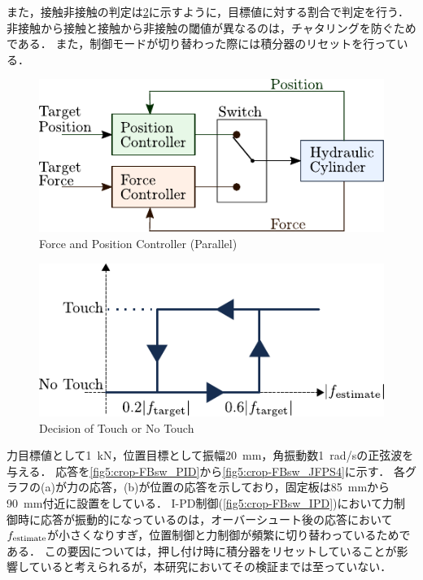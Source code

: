 また，接触非接触の判定は\figname\ref{fig5:touch_define}に示すように，目標値に対する割合で判定を行う．
非接触から接触と接触から非接触の閾値が異なるのは，チャタリングを防ぐためである．
また，制御モードが切り替わった際には積分器のリセットを行っている．

\begin{figure}[t]
    \centering
        \includegraphics[keepaspectratio, scale=1.0]{contents/IntegrationControl/figure/pararell_torqueandposition.pdf}
        \caption{Force and Position Controller (Parallel)}
        \label{fig5:pararell_torqueandposition}
\end{figure}

\begin{figure}[t]
    \centering
        \includegraphics[keepaspectratio, scale=1.0]{contents/IntegrationControl/figure/touch_define.pdf}
        \caption{Decision of Touch or No Touch}
        \label{fig5:touch_define}
\end{figure}

力目標値として\SI{1}{kN}，位置目標として振幅\SI{20}{mm}，角振動数\SI{1}{rad/s}の正弦波を与える．
応答を\figname\ref{fig5:crop-FBsw_PID}から\figname\ref{fig5:crop-FBsw_JFPS4}に示す．
各グラフの(a)が力の応答，(b)が位置の応答を示しており，固定板は\SI{85}{mm}から\SI{90}{mm}付近に設置をしている．
I-PD制御(\figname\ref{fig5:crop-FBsw_IPD})において力制御時に応答が振動的になっているのは，オーバーシュート後の応答において$f_\mathrm{estimate}$が小さくなりすぎ，位置制御と力制御が頻繁に切り替わっているためである．
この要因については，押し付け時に積分器をリセットしていることが影響していると考えられるが，本研究においてその検証までは至っていない．

